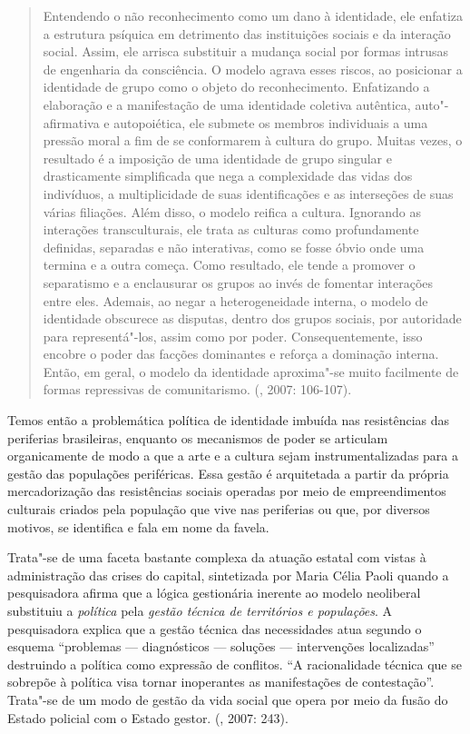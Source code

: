 \begin{quote}
Entendendo o não reconhecimento como um dano à identidade, ele enfatiza
a estrutura psíquica em detrimento das instituições sociais e da
interação social. Assim, ele arrisca substituir a mudança social por
formas intrusas de engenharia da consciência. O modelo agrava esses
riscos, ao posicionar a identidade de grupo como o objeto do
reconhecimento. Enfatizando a elaboração e a manifestação de uma
identidade coletiva autêntica, auto"-afirmativa e autopoiética, ele
submete os membros individuais a uma pressão moral a fim de se
conformarem à cultura do grupo. Muitas vezes, o resultado é a imposição
de uma identidade de grupo singular e drasticamente simplificada que
nega a complexidade das vidas dos indivíduos, a multiplicidade de suas
identificações e as interseções de suas várias filiações. Além disso, o
modelo reifica a cultura. Ignorando as interações transculturais, ele
trata as culturas como profundamente definidas, separadas e não
interativas, como se fosse óbvio onde uma termina e a outra começa. Como
resultado, ele tende a promover o separatismo e a enclausurar os grupos
ao invés de fomentar interações entre eles. Ademais, ao negar a
heterogeneidade interna, o modelo de identidade obscurece as disputas,
dentro dos grupos sociais, por autoridade para representá"-los, assim
como por poder. Consequentemente, isso encobre o poder das facções
dominantes e reforça a dominação interna. Então, em geral, o modelo da
identidade aproxima"-se muito facilmente de formas repressivas de
comunitarismo. (, 2007: 106-107).
\end{quote}

Temos então a problemática política de identidade imbuída nas
resistências das periferias brasileiras, enquanto os mecanismos de poder
se articulam organicamente de modo a que a arte e a cultura sejam
instrumentalizadas para a gestão das populações periféricas. Essa gestão
é arquitetada a partir da própria mercadorização das resistências
sociais operadas por meio de empreendimentos culturais criados pela
população que vive nas periferias ou que, por diversos motivos, se
identifica e fala em nome da favela.

Trata"-se de uma faceta bastante complexa da atuação estatal com vistas à
administração das crises do capital, sintetizada por Maria Célia Paoli
quando a pesquisadora afirma que a lógica gestionária inerente ao modelo
neoliberal substituiu a \emph{política} pela \emph{gestão técnica de
territórios e populações}. A pesquisadora explica que a gestão técnica
das necessidades atua segundo o esquema ``problemas --- diagnósticos ---
soluções --- intervenções localizadas'' destruindo a política como
expressão de conflitos. ``A racionalidade técnica que se sobrepõe à
política visa tornar inoperantes as manifestações de contestação''.
Trata"-se de um modo de gestão da vida social que opera por meio da fusão
do Estado policial com o Estado gestor. (, 2007: 243).

